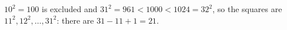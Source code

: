 $10^2=100$ is excluded and $31^2=961<1000<1024=32^2$, so the squares are $11^2,12^2,\dots,31^2$: there are $31-11+1=\boxed{21}$.
